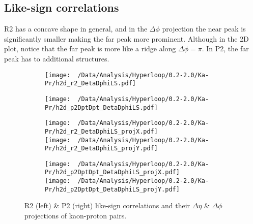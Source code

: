 \documentclass[12pt,a4paper,twoside]{report}
\begin{document}
\subsection{Like-sign correlations}
R2 has a concave shape in general, and in the $\Delta\phi$ projection the near peak is significantly smaller making the far peak more prominent. Although in the 2D plot, notice that the far peak is more like a ridge along $\Delta\phi=\pi$. In P2, the far peak has to additional structures.
\begin{figure}[H]
	\begin{subfigure}{0.49\linewidth}
		\texttt{[image: ~/Data/Analysis/Hyperloop/0.2-2.0/Ka-Pr/h2d\_r2\_DetaDphiLS.pdf]}\\
	\end{subfigure}
	\begin{subfigure}{0.49\linewidth}
		\texttt{[image: ~/Data/Analysis/Hyperloop/0.2-2.0/Ka-Pr/h2d\_p2DptDpt\_DetaDphiLS.pdf]}\\
	\end{subfigure}
\end{figure}
\begin{figure}[H]
	\ContinuedFloat
	\begin{subfigure}{0.49\linewidth}
		\texttt{[image: ~/Data/Analysis/Hyperloop/0.2-2.0/Ka-Pr/h2d\_r2\_DetaDphiLS\_projX.pdf]}\\
		\texttt{[image: ~/Data/Analysis/Hyperloop/0.2-2.0/Ka-Pr/h2d\_r2\_DetaDphiLS\_projY.pdf]}\\
	\end{subfigure}
	\begin{subfigure}{0.49\linewidth}
		\texttt{[image: ~/Data/Analysis/Hyperloop/0.2-2.0/Ka-Pr/h2d\_p2DptDpt\_DetaDphiLS\_projX.pdf]}\\
		\texttt{[image: ~/Data/Analysis/Hyperloop/0.2-2.0/Ka-Pr/h2d\_p2DptDpt\_DetaDphiLS\_projY.pdf]}\\
	\end{subfigure}
	\caption{R2 (left) \& P2 (right) like-sign correlations and their $\Delta\eta$ \& $\Delta\phi$ projections of kaon-proton pairs.}
\end{figure}
\end{document}
